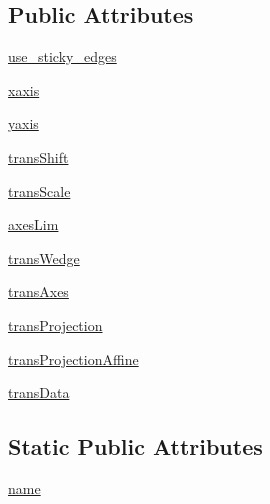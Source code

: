 \subsection*{Public Attributes}
\begin{DoxyCompactItemize}
\item 
\hyperlink{classmatplotlib_1_1projections_1_1polar_1_1PolarAxes_aefe25d1fe843ebd42652aa925b6a7645}{use\+\_\+sticky\+\_\+edges}
\item 
\hyperlink{classmatplotlib_1_1projections_1_1polar_1_1PolarAxes_a0d4847f998b78cfbe763a9833c85d39e}{xaxis}
\item 
\hyperlink{classmatplotlib_1_1projections_1_1polar_1_1PolarAxes_aeb9f01319c089c3599048d110d22c0ea}{yaxis}
\item 
\hyperlink{classmatplotlib_1_1projections_1_1polar_1_1PolarAxes_a9500ed33d82bd5d2bf85fc6cde61be1b}{trans\+Shift}
\item 
\hyperlink{classmatplotlib_1_1projections_1_1polar_1_1PolarAxes_a318b0bc581b937b0d210e5f3f3cd1200}{trans\+Scale}
\item 
\hyperlink{classmatplotlib_1_1projections_1_1polar_1_1PolarAxes_a036ede74d35147a49d28fbef7f605a99}{axes\+Lim}
\item 
\hyperlink{classmatplotlib_1_1projections_1_1polar_1_1PolarAxes_a091e3d88ca6a1df4fdc5e1fc13c0d09f}{trans\+Wedge}
\item 
\hyperlink{classmatplotlib_1_1projections_1_1polar_1_1PolarAxes_a9c4937f8e66207d19d2bce73933be072}{trans\+Axes}
\item 
\hyperlink{classmatplotlib_1_1projections_1_1polar_1_1PolarAxes_ae44aa284bbadfbeafbef067569ea7a37}{trans\+Projection}
\item 
\hyperlink{classmatplotlib_1_1projections_1_1polar_1_1PolarAxes_aa9cbe09c5a4eae1d7f0654c5a46a2ed6}{trans\+Projection\+Affine}
\item 
\hyperlink{classmatplotlib_1_1projections_1_1polar_1_1PolarAxes_ad6746f7924cba4278fb93229ed05c563}{trans\+Data}
\end{DoxyCompactItemize}
\subsection*{Static Public Attributes}
\begin{DoxyCompactItemize}
\item 
\hyperlink{classmatplotlib_1_1projections_1_1polar_1_1PolarAxes_a87b20a91dd501b3809c33115c6ad3b92}{name}
\end{DoxyCompactItemize}


